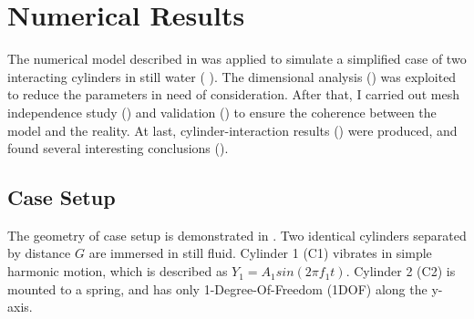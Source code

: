 
\chapter{Numerical Results} \label{cha: numerical results}

The numerical model described in  was applied to simulate a simplified case of two interacting cylinders in still water ( ). The dimensional analysis () was exploited to reduce the parameters in need of consideration. After that, I carried out mesh independence study () and validation () to ensure the coherence between the model and the reality. At last, cylinder-interaction results () were produced, and found several interesting conclusions ().


\section{Case Setup} \label{sec:casesetup}

The geometry of case setup is demonstrated in . Two identical cylinders separated by distance $ G $ are immersed in still fluid. Cylinder 1 (C1) vibrates in simple harmonic motion, which is described as $ Y_1=A_1 sin(2\pi f_1t) $. Cylinder 2 (C2) is mounted to a spring, and has only 1-Degree-Of-Freedom (1DOF) along the y-axis. %

